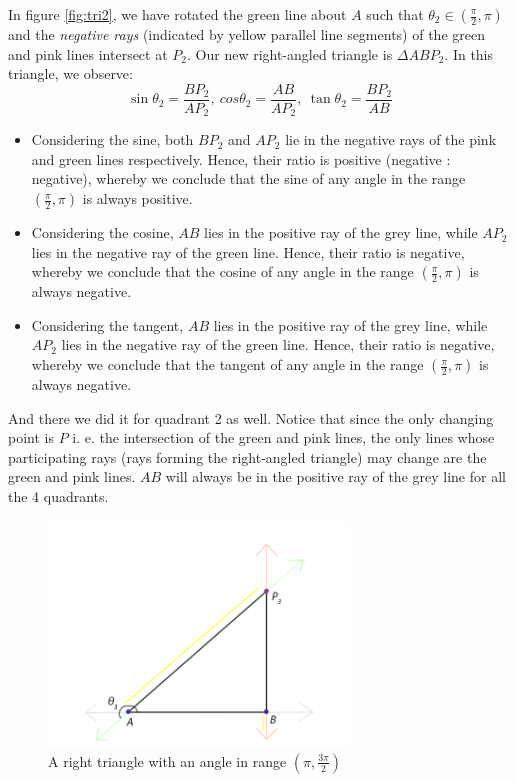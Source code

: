 \documentclass{article}
\begin{document}
In figure \ref{fig:tri2}, we have rotated the green line about $A$ such that $\theta_2\in(\frac{\pi}{2},\pi)$ and the \emph{negative rays} (indicated by yellow parallel line segments) of the green and pink lines intersect at $P_2$. Our new right-angled triangle is $\Delta ABP_2$. In this triangle, we observe:
$$\sin\theta_2=\frac{BP_2}{AP_2},\ cos\theta_2=\frac{AB}{AP_2},\ \tan\theta_2=\frac{BP_2}{AB}$$
\begin{itemize}
    \item Considering the sine, both $BP_2$ and $AP_2$ lie in the negative rays of the pink and green lines respectively. Hence, their ratio is positive (negative : negative), whereby we conclude that the sine of any angle in the range $(\frac{\pi}{2},\pi)$ is always positive.
    \item Considering the cosine, $AB$ lies in the positive ray of the grey line, while $AP_2$ lies in the negative ray of the green line. Hence, their ratio is negative, whereby we conclude that the cosine of any angle in the range $(\frac{\pi}{2},\pi)$ is always negative.
    \item Considering the tangent, $AB$ lies in the positive ray of the grey line, while $AP_2$ lies in the negative ray of the green line. Hence, their ratio is negative, whereby we conclude that the tangent of any angle in the range $(\frac{\pi}{2},\pi)$ is always negative.
\end{itemize}

And there we did it for quadrant 2 as well. Notice that since the only changing point is $P$ i. e. the intersection of the green and pink lines, the only lines whose participating rays (rays forming the right-angled triangle) may change are the green and pink lines. $AB$ will always be in the positive ray of the grey line for all the 4 quadrants.

\begin{figure}[!h]
    \centering
    \includegraphics[width=8cm]{triangle3}
    \caption{A right triangle with an angle in range $(\pi,\frac{3\pi}{2})$}
    \label{fig:tri3}
\end{figure}
\end{document}
